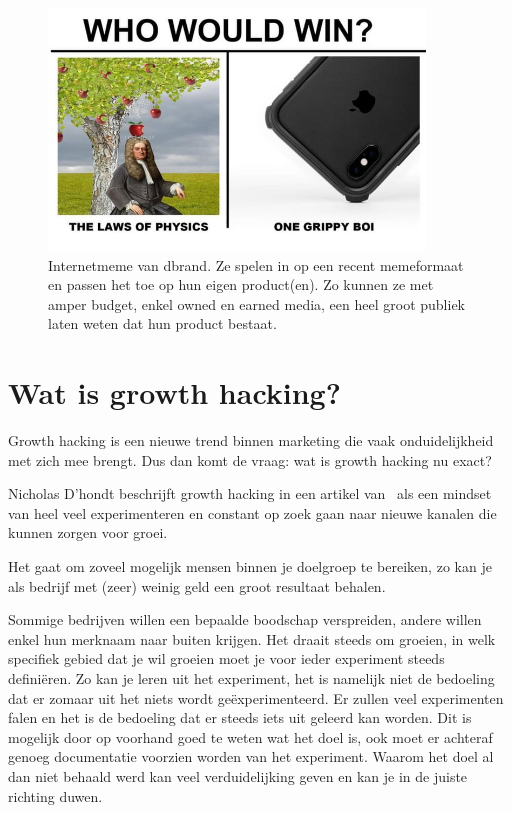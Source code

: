 \begin{figure}[h!]
	\includegraphics[width=100mm]{img/dbrand-internetmeme.jpg}
	\centering
	\caption{Internetmeme van dbrand. Ze spelen in op een recent memeformaat en passen het toe op hun eigen product(en). Zo kunnen ze met amper budget, enkel owned en earned media, een heel groot publiek laten weten dat hun product bestaat.}
	\label{fig:dbrand-meme}
\end{figure}

\section{Wat is growth hacking?}
\label{sec:wat-is-growth-hacking}
Growth hacking is een nieuwe trend binnen marketing die vaak onduidelijkheid met zich mee brengt. Dus dan komt de vraag: wat is growth hacking nu exact?

Nicholas D’hondt beschrijft growth hacking in een artikel van~\textcite{Birdhouse2019} als een mindset van heel veel experimenteren en constant op zoek gaan naar nieuwe kanalen die kunnen zorgen voor groei. 

Het gaat om zoveel mogelijk mensen binnen je doelgroep te bereiken, zo kan je als bedrijf met (zeer) weinig geld een groot resultaat behalen. 

Sommige bedrijven willen een bepaalde boodschap verspreiden, andere willen enkel hun merknaam naar buiten krijgen. Het draait steeds om groeien, in welk specifiek gebied dat je wil groeien moet je voor ieder experiment steeds definiëren. Zo kan je leren uit het experiment, het is namelijk niet de bedoeling dat er zomaar uit het niets wordt geëxperimenteerd. Er zullen veel experimenten falen en het is de bedoeling dat er steeds iets uit geleerd kan worden. Dit is mogelijk door op voorhand goed te weten wat het doel is, ook moet er achteraf genoeg documentatie voorzien worden van het experiment. Waarom het doel al dan niet behaald werd kan veel verduidelijking geven en kan je in de juiste richting duwen.

